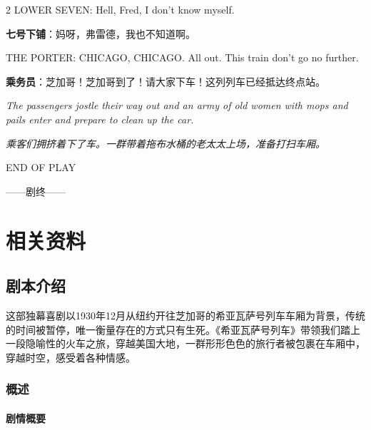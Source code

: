 \documentclass[lang=cn,newtx,10pt,scheme=chinese]{elegantbook}
\newcommand{\pair}[2]{%
\switchcolumn* #2\par
\switchcolumn  #1\par
}
\begin{document}
\begin{paracol}{2}
\pair{
    \textbf{七号下铺}：妈呀，弗雷德，我也不知道啊。
}{
    LOWER SEVEN: Hell, Fred, I don't know myself.
}

\pair{
    \textbf{乘务员}：芝加哥！芝加哥到了！请大家下车！这列列车已经抵达终点站。
}{
    THE PORTER: CHICAGO, CHICAGO. All out. This train don't go no further.
    \newline
}

\pair{
    \textit{乘客们拥挤着下了车。一群带着拖布水桶的老太太上场，准备打扫车厢。}
}{
    \textit{The passengers jostle their way out and an army of old women with mops and pails enter and prepare to clean up the car.}
    \newline
    \newline
}

\pair{
    ——剧终——
}{
    END OF PLAY
}

\end{paracol}

\part{相关资料}

\chapter{剧本介绍}

这部独幕喜剧以1930年12月从纽约开往芝加哥的希亚瓦萨号列车车厢为背景，传统的时间被暂停，唯一衡量存在的方式只有生死。《希亚瓦萨号列车》带领我们踏上一段隐喻性的火车之旅，穿越美国大地，一群形形色色的旅行者被包裹在车厢中，穿越时空，感受着各种情感。

\section{概述}

\subsection{剧情概要}
\end{document}
